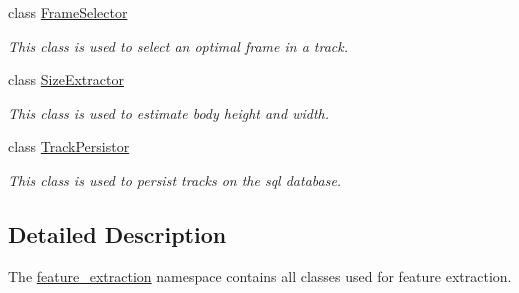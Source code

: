 \begin{DoxyCompactItemize}
class \mbox{\hyperlink{classfeature__extraction_1_1_frame_selector}{Frame\+Selector}}
\begin{DoxyCompactList}\small\item\em This class is used to select an optimal frame in a track. \end{DoxyCompactList}\item 
class \mbox{\hyperlink{classfeature__extraction_1_1_size_extractor}{Size\+Extractor}}
\begin{DoxyCompactList}\small\item\em This class is used to estimate body height and width. \end{DoxyCompactList}\item 
class \mbox{\hyperlink{classfeature__extraction_1_1_track_persistor}{Track\+Persistor}}
\begin{DoxyCompactList}\small\item\em This class is used to persist tracks on the sql database. \end{DoxyCompactList}\end{DoxyCompactItemize}


\subsection{Detailed Description}
The \mbox{\hyperlink{namespacefeature__extraction}{feature\+\_\+extraction}} namespace contains all classes used for feature extraction. 